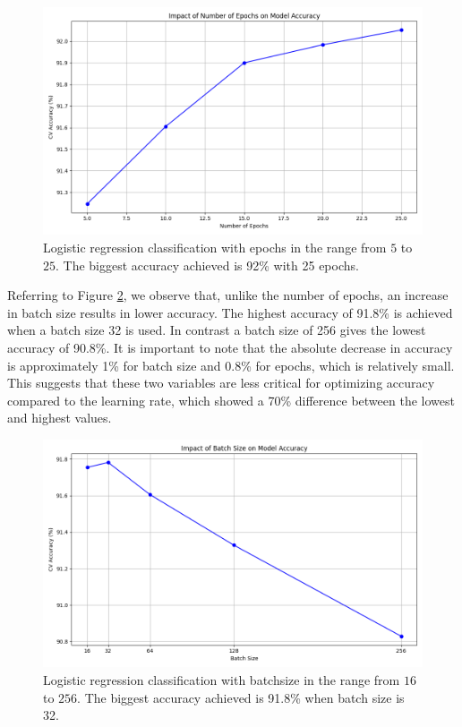 \begin{figure}[H]
    \centering
    \includegraphics[width=\textwidth]{results/logreg/number_of_epochs_study.png}
    \caption{Logistic regression classification with epochs in the range from $5$ to $25$. The biggest accuracy achieved is 92\% with 25 epochs.}
    \label{fig:LogRegEpochs}
\end{figure}

\newpage
Referring to Figure \ref{fig:LogRegBatchsize}, we observe that, unlike the number of epochs, an increase in batch size results in lower accuracy. The highest accuracy of 91.8\% is achieved when a batch size 32 is used. In contrast a batch size of 256 gives the lowest accuracy of 90.8\%. It is important to note that the absolute decrease in accuracy is approximately 1\% for batch size and 0.8\% for epochs, which is relatively small. This suggests that these two variables are less critical for optimizing accuracy compared to the learning rate, which showed a 70\% difference between the lowest and highest values.

\begin{figure}[H]
    \centering
    \includegraphics[width=\textwidth]{results/logreg/batch_size_study.png}
    \caption{Logistic regression classification with batchsize in the range from $16$ to $256$. The biggest accuracy achieved is 91.8\% when batch size is 32.}
    \label{fig:LogRegBatchsize}
\end{figure}

